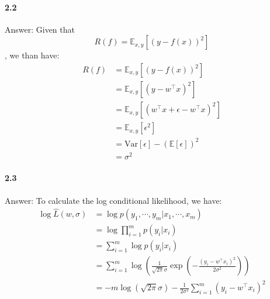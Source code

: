 \documentclass[11pt]{article}
\begin{document}
\paragraph{2.2}
Answer:
\newline
Given that 
\begin{equation}
    R(f) = \mathbb{E}_{x,y}[(y-f(x))^2]
\end{equation}
, we than have:
\begin{equation}
    \begin{split}
         R(f) &= \mathbb{E}_{x,y}[(y-f(x))^2] \\
         &= \mathbb{E}_{x,y}[(y-w^\top x)^2] \\
         &= \mathbb{E}_{x,y}[(w^\top x+\epsilon-w^\top x)^2]\\
         &= \mathbb{E}_{x,y}[\epsilon^2] \\
         &= \text{Var}[\epsilon]-(\mathbb{E}[\epsilon])^2 \\
         &= \sigma^2
    \end{split}
\end{equation}

\paragraph{2.3}
Answer:
\newline
To calculate the log conditional likelihood, we have:
\begin{equation}
    \begin{split}
        \log{\hat{L}(w, \sigma)} &= \log{p(y_1, \cdots, y_m|x_1, \cdots, x_m)}\\
        &= \log{\prod_{i=1}^m p(y_i|x_i)}\\
        &= \sum_{i=1}^m\log{p(y_i|x_i)}\\
        &= \sum_{i=1}^m\log{(\frac{1}{\sqrt{2\pi}\sigma}\exp{(-\frac{(y_i-w^\top x_i)^2}{2\sigma^2})})}\\
        &= -m\log{(\sqrt{2\pi}\sigma)} -\frac{1}{2\sigma^2}\sum_{i=1}^m(y_i-w^\top x_i)^2
    \end{split}
\end{equation}
\end{document}
